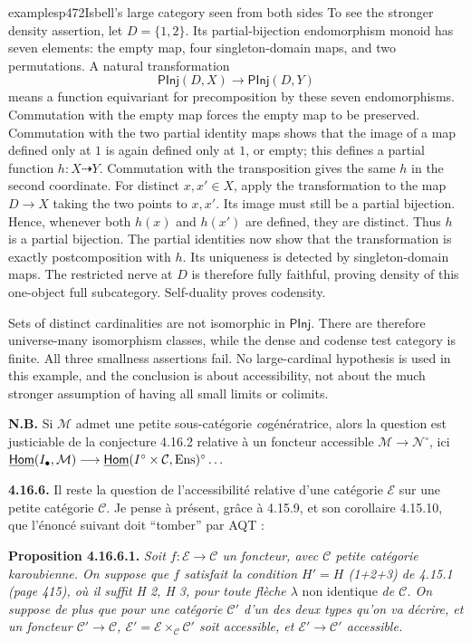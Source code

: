 \begin{dcomment}{examples}{p472}{Isbell's large category seen from both sides}
To see the stronger density assertion, let $D=\{1,2\}$. Its partial-bijection endomorphism monoid has seven elements: the empty map, four singleton-domain maps, and two permutations. A natural transformation
\[
 \mathsf{PInj}(D,X)\longrightarrow\mathsf{PInj}(D,Y)
\]
means a function equivariant for precomposition by these seven endomorphisms. Commutation with the empty map forces the empty map to be preserved. Commutation with the two partial identity maps shows that the image of a map defined only at $1$ is again defined only at $1$, or empty; this defines a partial function $h:X\dashrightarrow Y$. Commutation with the transposition gives the same $h$ in the second coordinate. For distinct $x,x'\in X$, apply the transformation to the map $D\to X$ taking the two points to $x,x'$. Its image must still be a partial bijection. Hence, whenever both $h(x)$ and $h(x')$ are defined, they are distinct. Thus $h$ is a partial bijection. The partial identities now show that the transformation is exactly postcomposition with $h$. Its uniqueness is detected by singleton-domain maps. The restricted nerve at $D$ is therefore fully faithful, proving density of this one-object full subcategory. Self-duality proves codensity.

Sets of distinct cardinalities are not isomorphic in $\mathsf{PInj}$. There are therefore universe-many isomorphism classes, while the dense and codense test category is finite. All three smallness assertions fail. No large-cardinal hypothesis is used in this example, and the conclusion is about accessibility, not about the much stronger assumption of having all small limits or colimits.
\end{dcomment}


\textbf{N.B.} Si $\mathcal{M}$ admet une petite sous-catégorie \textit{co}génératrice, alors la question est justiciable de la conjecture 4.16.2 relative à un foncteur accessible $\mathcal{M} \longrightarrow \mathcal{N}^\circ$, ici $\underline{\mathsf{Hom}}(I_\bullet,\mathcal{M}) \longrightarrow \underline{\mathsf{Hom}}(I^\circ \times \mathcal{C},\mathrm{Ens})^\circ \dots$

\textbf{4.16.6.} Il reste la question de l'accessibilité relative d'une catégorie $\mathcal{E}$ sur une petite catégorie $\mathcal{C}$. Je pense à présent, grâce à 4.15.9, et son corollaire 4.15.10, que l'énoncé suivant doit “tomber” par AQT :

\textbf{Proposition 4.16.6.1.} \textit{Soit $f : \mathcal{E} \longrightarrow \mathcal{C}$ un foncteur, avec $\mathcal{C}$ petite catégorie karoubienne. On suppose que $f$ satisfait la condition $H' = H$ (1+2+3) de 4.15.1 (page 415), où il suffit H 2, H 3, pour toute flèche $\lambda$} non identique \textit{de $\mathcal{C}$. On suppose de plus que pour une catégorie $\mathcal{C}'$ d'un des deux types qu'on va décrire, et un foncteur $\mathcal{C}' \longrightarrow \mathcal{C}$, $\mathcal{E}' = \mathcal{E} \times_{\mathcal{C}} \mathcal{C}'$ soit accessible, et $\mathcal{E}' \longrightarrow \mathcal{C}'$ accessible.}

